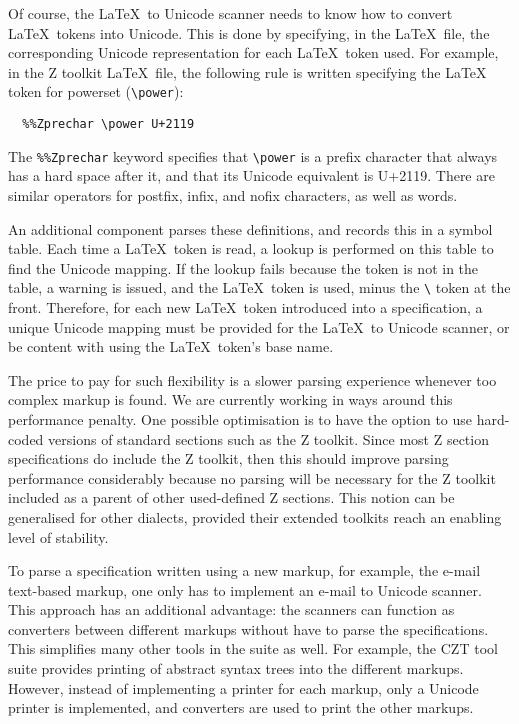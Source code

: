 \documentclass{llncs}
\begin{document}
Of course, the \LaTeX~to Unicode scanner needs to know how to convert
\LaTeX~tokens into Unicode. This is done by specifying, in the \LaTeX\ file,
the corresponding Unicode representation for each \LaTeX~token used. For example, in
the Z toolkit \LaTeX~file, the following rule is written specifying the \LaTeX~
token for powerset (\verb+\power+):
\begin{verbatim}
  %%Zprechar \power U+2119
\end{verbatim}
%
The {\tt \%\%Zprechar} keyword specifies that \verb+\power+ is a
prefix character that always has a hard space after it, and
that its Unicode equivalent is U+2119. There are similar operators for
postfix, infix, and nofix characters, as well as words.

An additional component parses these definitions, and records this in
a symbol table. Each time a \LaTeX~token is read, a lookup is
performed on this table to find the Unicode mapping. If the lookup
fails because the token is not in the table, a warning is issued, and
the \LaTeX~token is used, minus the \verb+\+ token at the
front. Therefore, for each new \LaTeX~token introduced into a
specification, a unique Unicode mapping must be provided for the
\LaTeX~to Unicode scanner, or be content with using the \LaTeX~token's
base name.

The price to pay for such flexibility is a slower parsing experience
whenever too complex markup is found.
We are currently working in ways around this performance penalty.
One possible optimisation is to have the option to use hard-coded versions
of standard sections such as the Z toolkit.
Since most Z section specifications do include the Z toolkit, then this should
improve parsing performance considerably because no parsing will be necessary for
the Z toolkit included as a parent of other used-defined Z sections.
This notion can be generalised for other dialects, provided their extended toolkits
reach an enabling level of stability.

To parse a specification written using a new markup, for example, the
e-mail text-based markup, one only has to implement an e-mail to Unicode
scanner. This approach has an additional advantage: the scanners can function as
converters between different markups without have to parse the
specifications. This simplifies many other tools in the suite as
well. For example, the CZT tool suite provides printing of abstract
syntax trees into the different markups. However, instead of
implementing a printer for each markup, only a Unicode printer is
implemented, and converters are used to print the other markups.
\end{document}
